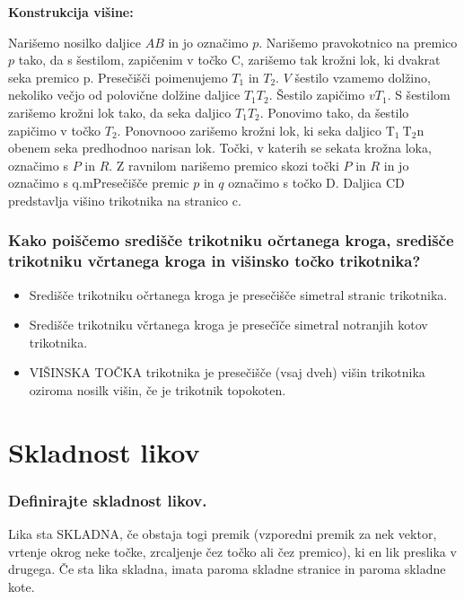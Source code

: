 \documentclass{article}
\begin{document}
\textbf{Konstrukcija višine:}

Narišemo nosilko daljice $A B$ in jo označimo $p$. Narišemo pravokotnico na premico $p$ tako, da s šestilom, zapičenim v točko C, zarišemo tak krožni lok, ki dvakrat seka premico p. Presečišči poimenujemo $T_{1}$ in $T_{2}$. $V$ šestilo vzamemo dolžino, nekoliko večjo od polovične dolžine daljice $T_{1} T_{2}$. Šestilo zapičimo $v T_{1}$. S šestilom zarišemo krožni lok tako, da seka daljico $T_{1} T_{2}$. Ponovimo tako, da šestilo zapičimo v točko $T_{2}$. Ponovnooo zarišemo krožni lok, ki seka daljico $\mathrm{T}_{1} \mathrm{~T}_{2} \mathrm{n}$ obenem seka predhodnoo narisan lok. Točki, v katerih se sekata krožna loka, označimo s $P$ in $R$. $\mathrm{Z}$ ravnilom narišemo premico skozi točki $P$ in $R$ in jo označimo s q.mPresečišče premic $p$ in $q$ označimo s točko D. Daljica CD predstavlja višino trikotnika na stranico c.

\subsubsection*{Kako poiščemo središče trikotniku očrtanega kroga, središče trikotniku včrtanega kroga in višinsko točko trikotnika?}
\begin{itemize}
  \item Središče trikotniku očrtanega kroga je presečišče simetral stranic trikotnika.

  \item Središče trikotniku včrtanega kroga je presečǐče simetral notranjih kotov trikotnika.

  \item VIŠINSKA TOČKA trikotnika je presečišče (vsaj dveh) višin trikotnika oziroma nosilk višin, če je trikotnik topokoten.

\end{itemize}

\section{Skladnost likov}

\subsubsection*{Definirajte skladnost likov.}

Lika sta SKLADNA, če obstaja togi premik (vzporedni premik za nek vektor, vrtenje okrog neke točke, zrcaljenje čez točko ali čez premico), ki en lik preslika v drugega. Če sta lika skladna, imata paroma skladne stranice in paroma skladne kote.
\end{document}
